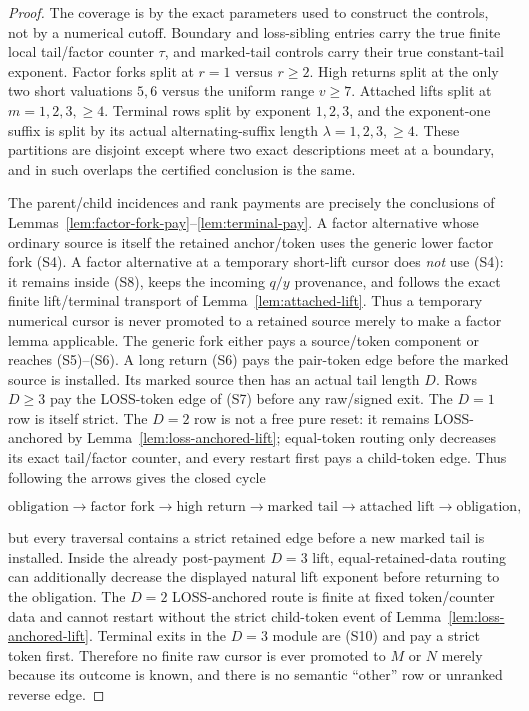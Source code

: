 \documentclass[11pt]{article}
\begin{document}
\begin{proof}
The coverage is by the exact parameters used to construct the controls, not
by a numerical cutoff.  Boundary and loss-sibling entries carry the true
finite local tail/factor counter $\tau$, and marked-tail controls carry their
true constant-tail exponent.  Factor forks split at $r=1$ versus $r\ge2$.
High returns split at the only two short valuations $5,6$ versus the uniform
range $v\ge7$.  Attached lifts split at $m=1,2,3,\ge4$.  Terminal rows split by
exponent $1,2,3$, and the exponent-one suffix is split by its actual
alternating-suffix length $\lambda=1,2,3,\ge4$.  These partitions are
disjoint except where two exact descriptions meet at a boundary, and in such
overlaps the certified conclusion is the same.

The parent/child incidences and rank payments are precisely the conclusions
of Lemmas~\ref{lem:factor-fork-pay}--\ref{lem:terminal-pay}.  A factor
alternative whose ordinary source is itself the retained anchor/token uses
the generic lower factor fork (S4).  A factor alternative at a temporary
short-lift cursor does \emph{not} use (S4): it remains inside (S8), keeps the
incoming $q/y$ provenance, and follows the exact finite lift/terminal
transport of Lemma~\ref{lem:attached-lift}.  Thus a temporary numerical
cursor is never promoted to a retained source merely to make a factor lemma
applicable.  The generic fork either pays a source/token component or reaches
(S5)--(S6).  A long return (S6) pays the pair-token edge before the marked
source is installed.  Its marked source then has an actual tail length $D$.
Rows $D\ge3$ pay the LOSS-token edge of (S7) before any raw/signed exit.
The $D=1$ row is itself strict. The $D=2$ row is not a free pure reset: it
remains LOSS-anchored by Lemma~\ref{lem:loss-anchored-lift}; equal-token
routing only decreases its exact tail/factor counter, and every restart first
pays a child-token edge.  Thus following the arrows gives the
closed cycle

\[
  \text{obligation}\to\text{factor fork}\to\text{high return}
  \to\text{marked tail}\to\text{attached lift}\to\text{obligation},
\]

but every traversal contains a strict retained edge before a new marked tail
is installed.  Inside the already post-payment $D=3$ lift, equal-retained-data
routing can additionally decrease the displayed natural lift exponent before
returning to the obligation.  The $D=2$ LOSS-anchored route is finite at fixed token/counter data and
cannot restart without the strict child-token event of
Lemma~\ref{lem:loss-anchored-lift}. Terminal exits in the $D=3$ module
are (S10) and pay a strict token first.  Therefore no finite raw cursor is ever promoted to
$M$ or $N$ merely because its outcome is known, and there is no semantic
``other'' row or unranked reverse edge.
\end{proof}
\end{document}
